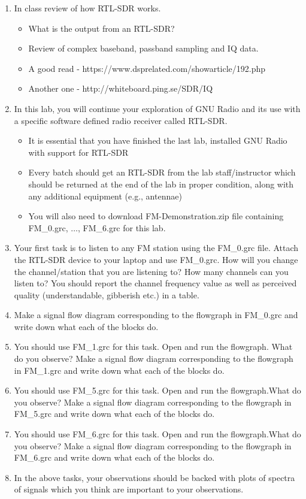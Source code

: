 \begin{enumerate}
\item In class review of how RTL-SDR works.
\begin{itemize}
    \item What is the output from an RTL-SDR?
    \item Review of complex baseband, passband sampling and IQ data.
    \item A good read - https://www.dsprelated.com/showarticle/192.php
    \item Another one - http://whiteboard.ping.se/SDR/IQ
\end{itemize}
\item In this lab, you will continue your exploration of GNU Radio and its use with a specific software defined radio receiver called RTL-SDR.
    \begin{itemize}
    \item It is essential that you have finished the last lab, installed GNU Radio with support for RTL-SDR
    \item Every batch should get an RTL-SDR from the lab staff/instructor which should be returned at the end of the lab in proper condition, along with any additional equipment (e.g., antennae)
    \item You will also need to download FM-Demonstration.zip file containing FM\_0.grc, $\dots$, FM\_6.grc for this lab.
    \end{itemize}
\item Your first task is to listen to any FM station using the FM\_0.grc file. Attach the RTL-SDR device to your laptop and use FM\_0.grc. How will you change the channel/station that you are listening to? How many channels can you listen to? You should report the channel frequency value as well as perceived quality (understandable, gibberish etc.) in a table.
\item Make a signal flow diagram corresponding to the flowgraph in FM\_0.grc and write down what each of the blocks do.
\item You should use FM\_1.grc for this task. Open and run the flowgraph. What do you observe? Make a signal flow diagram corresponding to the flowgraph in FM\_1.grc and write down what each of the blocks do.
\item You should use FM\_5.grc for this task. Open and run the flowgraph.What do you observe? Make a signal flow diagram corresponding to the flowgraph in FM\_5.grc and write down what each of the blocks do.
\item You should use FM\_6.grc for this task. Open and run the flowgraph.What do you observe? Make a signal flow diagram corresponding to the flowgraph in FM\_6.grc and write down what each of the blocks do.
\item In the above tasks, your observations should be backed with plots of spectra of signals which you think are important to your observations.
\end{enumerate}
